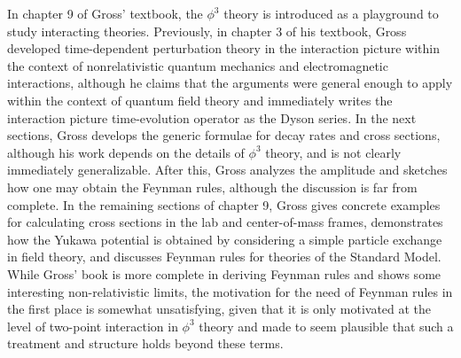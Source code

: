 {In chapter 9 of Gross' textbook, the $\phi^3$ theory is introduced as a playground to study interacting theories.
Previously, in chapter 3 of his textbook, Gross developed time-dependent perturbation theory in the interaction picture within the context of nonrelativistic quantum mechanics and electromagnetic interactions, although he claims that the arguments were general enough to apply within the context of quantum field theory and immediately writes the interaction picture time-evolution operator as the Dyson series.
In the next sections, Gross develops the generic formulae for decay rates and cross sections, although his work depends on the details of $\phi^3$ theory, and is not clearly immediately generalizable.
After this, Gross analyzes the amplitude and sketches how one may obtain the Feynman rules, although the discussion is far from complete.
In the remaining sections of chapter 9, Gross gives concrete examples for calculating cross sections in the lab and center-of-mass frames, demonstrates how the Yukawa potential is obtained by considering a simple particle exchange in field theory, and discusses Feynman rules for theories of the Standard Model.
While Gross' book is more complete in deriving Feynman rules and shows some interesting non-relativistic limits, the motivation for the need of Feynman rules in the first place is somewhat unsatisfying, given that it is only motivated at the level of two-point interaction in $\phi^3$ theory and made to seem plausible that such a treatment and structure holds beyond these terms.

}
    

